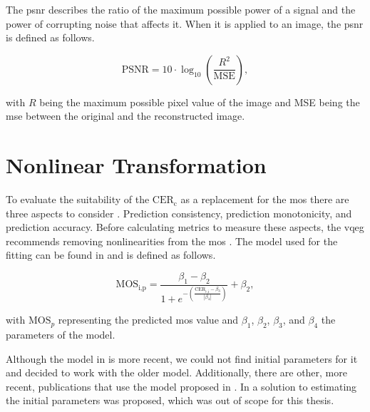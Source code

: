 The \gls{psnr} \cite{PSNRvsSSIM_2010} describes the ratio of the maximum possible power of a signal and the power of corrupting noise that affects it.
When it is applied to an image, the \gls{psnr} is defined as follows.

\begin{equation}
    \text{PSNR} = 10 \cdot \log_{10} \left( \frac{R^2}{\text{MSE}} \right),
    \label{eq:psnr}
\end{equation}

with \(R\) being the maximum possible pixel value of the image and MSE being the \gls{mse} between the original and the reconstructed image.


\section{Nonlinear Transformation}
\label{sec:nonlinear}

To evaluate the suitability of the $\text{CER}_{\text{c}}$ as a replacement for the \gls{mos} there are three aspects to consider \cite{nonlin_fit_original_2003}\cite{iqa_survey_2020}.
Prediction consistency, prediction monotonicity, and prediction accuracy.
Before calculating metrics to measure these aspects, the \gls{vqeg} recommends removing nonlinearities from the \gls{mos} \cite{nonlin_fit_original_2003}.
The model used for the fitting can be found in \cite{nonlin_fit_model_init_2000}\cite{nonlin_fit_appl_2017} and is defined as follows.

\begin{equation}
    \text{MOS}_{\text{i,p}} = \frac{\beta_{1}-\beta_{2}}{1 + e^{-\left(\frac{\text{CER}_{\text{c,i}}-\beta_{3}}{|\beta_{4}|}\right)}} + \beta_{2},
    \label{eq:nonlinear}
\end{equation}


with $\text{MOS}_{p}$ representing the predicted \gls{mos} value and $\beta_{1}$, $\beta_{2}$, $\beta_{3}$, and $\beta_{4}$ the parameters of the model.

Although the model in \cite{nonlin_fit_original_2003} is more recent, we could not find initial parameters for it and decided to work with the older model.
Additionally, there are other, more recent, publications \cite{ni_esim_2017, nonlin_fit_appl_2017, nonlin_fit_appl_2018, nonlin_fit_appl_2014, nonlin_fit_appl_2011, nonlin_fit_appl_2015, doc_quality_survey_2023, iqa_database_2023, nonlin_fit_appl_2016} that use the model proposed in \cite{nonlin_fit_new_model_2006}.
In \cite{nonlin_fit_init_proof_2017} a solution to estimating the initial parameters was proposed, which was out of scope for this thesis.

